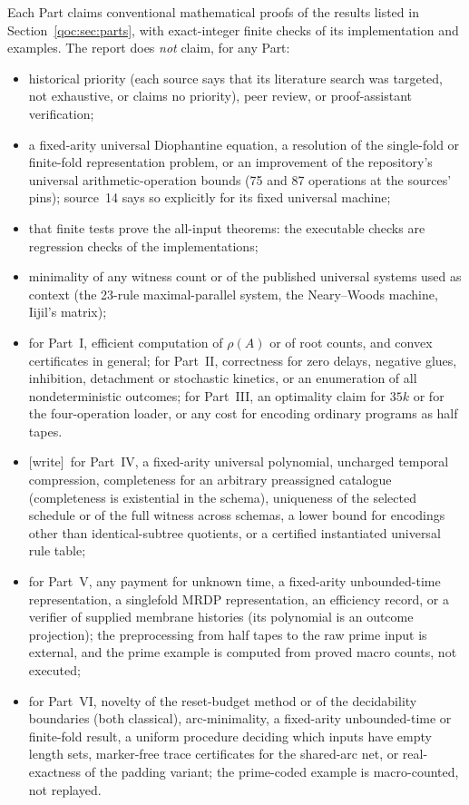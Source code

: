 \documentclass[11pt,letterpaper]{article}
\theoremstyle{definition}
\theoremstyle{remark}
\newcommand{\wtag}{\textup{[write]}}
\begin{document}
Each Part claims conventional mathematical proofs of the results listed in Section~\ref{qoc:sec:parts}, with exact-integer finite checks of its implementation and examples. The report does \emph{not} claim, for any Part:
\begin{itemize}
\item historical priority (each source says that its literature search was targeted, not exhaustive, or claims no priority), peer review, or proof-assistant verification;
\item a fixed-arity universal Diophantine equation, a resolution of the single-fold or finite-fold representation problem, or an improvement of the repository's universal arithmetic-operation bounds (75 and 87 operations at the sources' pins); source~14 says so explicitly for its fixed universal machine;
\item that finite tests prove the all-input theorems: the executable checks are regression checks of the implementations;
\item minimality of any witness count or of the published universal systems used as context (the 23-rule maximal-parallel system, the Neary--Woods machine, Iijil's matrix);
\item for Part~I, efficient computation of $\rho(A)$ or of root counts, and convex certificates in general; for Part~II, correctness for zero delays, negative glues, inhibition, detachment or stochastic kinetics, or an enumeration of all nondeterministic outcomes; for Part~III, an optimality claim for $35k$ or for the four-operation loader, or any cost for encoding ordinary programs as half tapes.
\item \wtag\ for Part~IV, a fixed-arity universal polynomial, uncharged temporal compression, completeness for an arbitrary preassigned catalogue (completeness is existential in the schema), uniqueness of the selected schedule or of the full witness across schemas, a lower bound for encodings other than identical-subtree quotients, or a certified instantiated universal rule table;
\item for Part~V, any payment for unknown time, a fixed-arity unbounded-time representation, a singlefold MRDP representation, an efficiency record, or a verifier of supplied membrane histories (its polynomial is an outcome projection); the preprocessing from half tapes to the raw prime input is external, and the prime example is computed from proved macro counts, not executed;
\item for Part~VI, novelty of the reset-budget method or of the decidability boundaries (both classical), arc-minimality, a fixed-arity unbounded-time or finite-fold result, a uniform procedure deciding which inputs have empty length sets, marker-free trace certificates for the shared-arc net, or real-exactness of the padding variant; the prime-coded example is macro-counted, not replayed.
\end{itemize}
\end{document}
